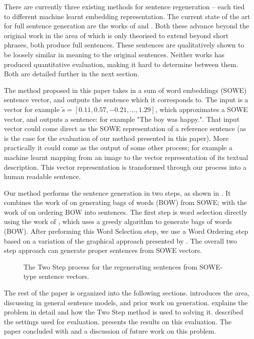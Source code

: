 \documentclass[11pt]{article}
\theoremstyle{plain}
\theoremstyle{definition}
\begin{document}
There are currently three existing methods for sentence regeneration -- each tied to different machine learnt embedding representation. 
The current state of the art for full sentence generation are the works of \cite{iyyer2014generating} and \cite{Bowman2015SmoothGeneration}. 
Both these advance beyond the original work in the area of \cite{Dinu2014CompositionalGeneration} which is only theorised to extend beyond short phrases, both produce full sentences. These sentences are qualitatively shown to be loosely similar in meaning to the original sentences. Neither works has produced quantitative evaluation, making it hard to determine between them. Both are detailed further in the next section.


The method proposed in this paper takes in a sum of word embeddings (SOWE) sentence vector, and outputs the sentence which it corresponds to. The input is a vector for example $\tilde{s}=[0.11, 0.57,-0.21,...,1.29]$, which approximates a SOWE vector, and outputs a sentence: for example "The boy was happy.". That input vector could come direct as the SOWE representation of a reference sentence (as is the case for the evaluation of our method presented in this paper). More practically it could come as the output of some other process; for example a machine learnt mapping from an image to the vector representation of its textual description. This vector representation is transformed through our process into a human readable sentence.

Our method performs the sentence generation in two steps, as shown in . It combines the work of \textcite{White2015BOWgen} on generating bags of words (BOW) from SOWE; with the work of \textcite{Horvat2014} on ordering BOW into sentences. The first step is word selection directly using the work of \textcite{White2015BOWgen}, which uses a greedy algorithm to generate bags of words (BOW). After preforming this Word Selection step, we use a Word Ordering step based on a variation of the graphical approach presented by \textcite{Horvat2014}. The overall two step approach can generate proper sentences from SOWE vectors.
\begin{figure}
	\centering 
	
	\caption{The Two Step process for the regenerating sentences from SOWE-type sentence vectors.}
	\label{block_diagram}
\end{figure}

The rest of the paper is organized into the following sections.  introduces the area, discussing in general sentence models, and prior work on generation.  explains the problem in detail and how the Two Step method is used to solving it.  described the settings used for evaluation.  presents the results on this evaluation. The paper concluded with  and a discussion of future work on this problem.
\end{document}
